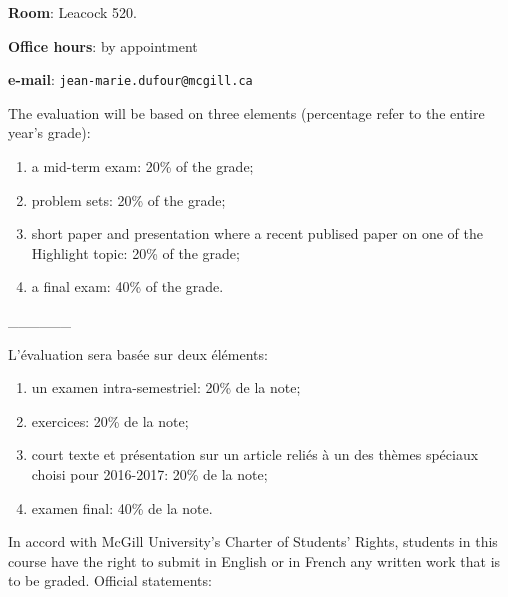 \documentclass[titlepage,11pt,amstex]{article}
\begin{document}
\noindent \textbf{Room}: Leacock 520.

\noindent \textbf{Office hours}: by appointment

\quad

\noindent \textbf{e-mail}: \texttt{jean-marie.dufour@mcgill.ca}

\quad

\noindent The evaluation will be based on three elements (percentage refer
to the entire year's grade):

\begin{enumerate}
\item a mid-term exam: 20\% of the grade;

\item problem sets: 20\% of the grade;

\item short paper and presentation where a recent publised paper on one of
the Highlight topic: 20\% of the grade;

\item a final exam: 40\% of the grade.
\end{enumerate}

\begin{center}
\_\_\_\_\_\_
\end{center}

\noindent L'\'{e}valuation sera bas\'{e}e sur deux \'{e}l\'{e}ments:

\begin{enumerate}
\item un examen intra-semestriel: 20\% de la note;

\item exercices: 20\% de la note;

\item court texte et pr\'{e}sentation sur un article reli\'{e}s \`{a} un des
th\`{e}mes sp\'{e}ciaux choisi pour 2016-2017: 20\% de la note;

\item examen final: 40\% de la note.
\end{enumerate}

\quad \newpage

\noindent In accord with McGill University's Charter of Students' Rights,
students in this course have the right to submit in English or in French any
written work that is to be graded. \newline
\quad \newline
Official statements:

\quad
\end{document}
